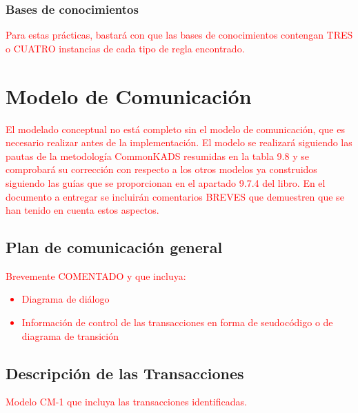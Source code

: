 \documentclass[12pt,a4paper,twoside,spanish]{article}      %
\begin{document}
\subsubsection{Bases de conocimientos}

\textcolor {red} {Para estas prácticas, bastará con que las bases de conocimientos contengan TRES o CUATRO instancias de cada tipo de regla encontrado.}

\section{Modelo de Comunicación}

\textcolor {red} {El modelado conceptual no está completo sin el modelo de comunicación, que es necesario realizar antes de la implementación. El modelo se realizará siguiendo las pautas de la metodología CommonKADS resumidas en la tabla 9.8 y se comprobará su corrección con respecto a los otros modelos ya construidos siguiendo las guías que se proporcionan en el apartado 9.7.4 del libro. En el documento a entregar se incluirán comentarios BREVES que demuestren que se han tenido en cuenta estos aspectos.}

\subsection{Plan de comunicación general}

\textcolor {red}
{
Brevemente COMENTADO y que incluya:
\begin{itemize}
 \item Diagrama de diálogo
 \item Información de control de las transacciones en forma de
seudocódigo o de diagrama de transición
\end{itemize}
}

\subsection{Descripción de las Transacciones}
\textcolor {red} {Modelo CM-1 que incluya las transacciones identificadas.}
\end{document}
